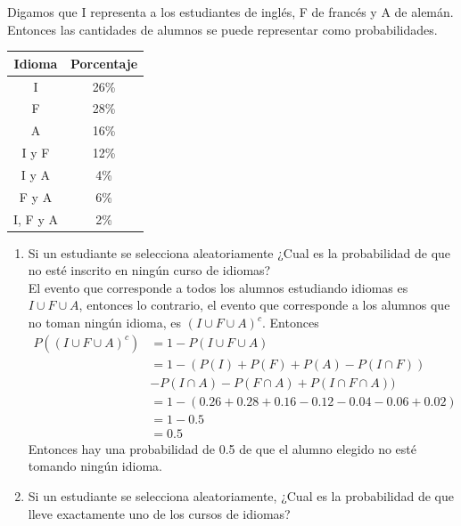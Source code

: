 \documentclass[12pt,a4paper]{report}
\begin{document}
\begin{enumerate}
{	 Digamos que I representa a los estudiantes de inglés, F de francés y A de alemán.
	 Entonces las cantidades de alumnos se puede representar como probabilidades.

		\begin{center}
		 \begin{tabular}{|c|c|}
							\hline
							Idioma & Porcentaje  \\
							\hline
							I & 26\% \\
							\hline
							F & 28\% \\
							\hline
							A & 16\% \\
							\hline
							I y F & 12\% \\
							\hline
							I y A & 4\% \\
							\hline
							F y A & 6\% \\
							\hline
							I, F y A & 2\% \\
							\hline
			\end{tabular}
		\end{center}

	\begin{enumerate}[label=\alph*) ]
   \item {
		Si un estudiante se selecciona aleatoriamente ¿Cual es la probabilidad de que no esté inscrito en ningún curso de idiomas?\\

		El evento que corresponde a todos los alumnos estudiando idiomas es
		$I \cup F \cup A$, entonces lo contrario, el evento que corresponde a los
		alumnos que no toman ningún idioma, es $(I \cup F \cup A)^c$.
		Entonces
		\begin{align*}
			P((I \cup F \cup A)^c) &= 1 - P(I \cup F \cup A)\\
														 &= 1 - (P(I) + P(F) + P(A) - P(I \cap F))\\
														 &- P(I \cap A) - P(F \cap A) + P(I \cap F \cap A))\\
														 &= 1 - (0.26 + 0.28 + 0.16 - 0.12 - 0.04 - 0.06 + 0.02)\\
														 &= 1 - 0.5\\
														 &= 0.5
		\end{align*}
		Entonces hay una probabilidad de 0.5 de que el alumno elegido no esté tomando ningún idioma.
   }

   \item {
   Si un estudiante se selecciona aleatoriamente, ¿Cual es la probabilidad de que lleve exactamente uno de los cursos de idiomas?\\

}
\end{enumerate}}
\end{enumerate}
\end{document}
